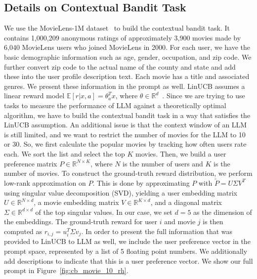 \documentclass[11pt, logo]{googledeepmind}
\newcommand{\E}{\mathbb{E}}
\newcommand{\R}{\mathbb{R}}
\theoremstyle{plain}
\theoremstyle{definition}
\begin{document}
\subsection{Details on Contextual Bandit Task}
\label{app_subsec: cb_detail}
We use the MovieLens-1M dataset~\citep{harper2015movielens} to build the contextual bandit task. It contains 1,000,209 anonymous ratings of approximately 3,900 movies
made by 6,040 MovieLens users who joined MovieLens in 2000. For each user, we have the basic demographic information such as age, gender, occupation, and zip code. We further convert zip code to the actual name of the county and state and add these into the user profile description text. Each movie has a title and associated genres. We present these information in the prompt as well.
LinUCB assumes a linear reward model $\E[r|x, a] = \theta_a^T x$, where $\theta \in \R^d$~\citep{chu2011contextual}. Since we are trying to use tasks to measure the performance of LLM against a theoretically optimal algorithm, we have to build the contextual bandit task in a way that satisfies the LinUCB assumption. An additional issue is that the context window of an LLM is still limited, and we want to restrict the number of movies for the LLM to 10 or 30. So, we first calculate the popular movies by tracking how often users rate each. We sort the list and select the top $K$ movies.
Then, we build a user preference matrix $P \in \R^{N \times K}$, where $N$ is the number of users and $K$ is the number of movies.
To construct the ground-truth reward distribution, we perform low-rank approximation on $P$.
This is done by approximating $P$ with $\tilde{P} = U \Sigma V^T$ using singular value decomposition (SVD), yielding a user embedding matrix $U \in \mathbb{R}^{N \times d}$, a movie embedding matrix $V \in \mathbb{R}^{K \times d}$, and a diagonal matrix $\Sigma \in \mathbb{R}^{d \times d}$ of the top singular values. In our case, we set $d=5$ as the dimension of the embeddings. The ground-truth reward for user $i$ and movie $j$ is then computed as $r_{i,j} = u_i^T \Sigma v_j$.
In order to present the full information that was provided to LinUCB to LLM as well, we include the user preference vector in the prompt space, represented by a list of 5 floating point numbers. We additionally add descriptions to indicate that this is a user preference vector. We show our full prompt in Figure~\ref{fig:cb_movie_10_rh}.
\end{document}
